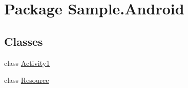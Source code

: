 \hypertarget{namespace_sample_1_1_android}{\section{Package Sample.\+Android}
\label{namespace_sample_1_1_android}
}
\subsection*{Classes}
\begin{DoxyCompactItemize}
\item 
class \hyperlink{class_sample_1_1_android_1_1_activity1}{Activity1}
\item 
class \hyperlink{class_sample_1_1_android_1_1_resource}{Resource}
\end{DoxyCompactItemize}
